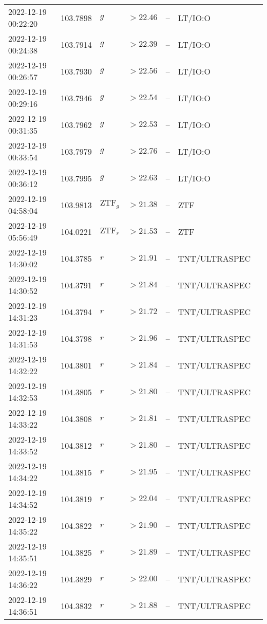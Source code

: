 \documentclass{nature_plusfigure}
\begin{document}
\begin{supplement}
\begin{center}
\begin{longtable}{lllllll}
2022-12-19 00:22:20 & 103.7898 & $g$ & $>22.46$ & -- & LT/IO:O &  \\ 
2022-12-19 00:24:38 & 103.7914 & $g$ & $>22.39$ & -- & LT/IO:O &  \\ 
2022-12-19 00:26:57 & 103.7930 & $g$ & $>22.56$ & -- & LT/IO:O &  \\ 
2022-12-19 00:29:16 & 103.7946 & $g$ & $>22.54$ & -- & LT/IO:O &  \\ 
2022-12-19 00:31:35 & 103.7962 & $g$ & $>22.53$ & -- & LT/IO:O &  \\ 
2022-12-19 00:33:54 & 103.7979 & $g$ & $>22.76$ & -- & LT/IO:O &  \\ 
2022-12-19 00:36:12 & 103.7995 & $g$ & $>22.63$ & -- & LT/IO:O &  \\ 
2022-12-19 04:58:04 & 103.9813 & $\mathrm{ZTF}_{g}$ & $>21.38$ & -- & ZTF &  \\ 
2022-12-19 05:56:49 & 104.0221 & $\mathrm{ZTF}_{r}$ & $>21.53$ & -- & ZTF &  \\ 
2022-12-19 14:30:02 & 104.3785 & $r$ & $>21.91$ & -- & TNT/ULTRASPEC &  \\ 
2022-12-19 14:30:52 & 104.3791 & $r$ & $>21.84$ & -- & TNT/ULTRASPEC &  \\ 
2022-12-19 14:31:23 & 104.3794 & $r$ & $>21.72$ & -- & TNT/ULTRASPEC &  \\ 
2022-12-19 14:31:53 & 104.3798 & $r$ & $>21.96$ & -- & TNT/ULTRASPEC &  \\ 
2022-12-19 14:32:22 & 104.3801 & $r$ & $>21.84$ & -- & TNT/ULTRASPEC &  \\ 
2022-12-19 14:32:53 & 104.3805 & $r$ & $>21.80$ & -- & TNT/ULTRASPEC &  \\ 
2022-12-19 14:33:22 & 104.3808 & $r$ & $>21.81$ & -- & TNT/ULTRASPEC &  \\ 
2022-12-19 14:33:52 & 104.3812 & $r$ & $>21.80$ & -- & TNT/ULTRASPEC &  \\ 
2022-12-19 14:34:22 & 104.3815 & $r$ & $>21.95$ & -- & TNT/ULTRASPEC &  \\ 
2022-12-19 14:34:52 & 104.3819 & $r$ & $>22.04$ & -- & TNT/ULTRASPEC &  \\ 
2022-12-19 14:35:22 & 104.3822 & $r$ & $>21.90$ & -- & TNT/ULTRASPEC &  \\ 
2022-12-19 14:35:51 & 104.3825 & $r$ & $>21.89$ & -- & TNT/ULTRASPEC &  \\ 
2022-12-19 14:36:22 & 104.3829 & $r$ & $>22.00$ & -- & TNT/ULTRASPEC &  \\ 
2022-12-19 14:36:51 & 104.3832 & $r$ & $>21.88$ & -- & TNT/ULTRASPEC &  \\ 

\end{longtable}
\end{center}
\end{supplement}
\end{document}
